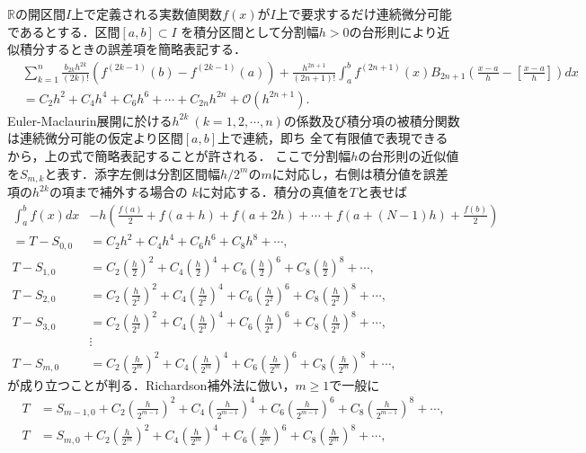 \documentclass[a4j,papersize,disablejfam,slide,14pt]{jsarticle}
\begin{document}
    $\mathbb{R}$の開区間$I$上で定義される実数値関数$f(x)$が$I$上で要求するだけ連続微分可能であるとする．区間$[a,b] \subset I$
    を積分区間として分割幅$h>0$の台形則により近似積分するときの誤差項を簡略表記する．
    \begin{align}
    	&\sum_{k=1}^{n} \frac{b_{2k} h^{2k}}{(2k)!} \left( f^{(2k-1)}(b) - f^{(2k-1)}(a) \right) 
        + \frac{h^{2n+1}}{(2n+1)!} \int_{a}^{b} f^{(2n+1)}(x) B_{2n+1}\left(\frac{x-a}{h} - \left[\frac{x-a}{h}\right]\right)dx \\
        &= C_2 h^2 + C_4 h^4 + C_6 h^6 + \cdots + C_{2n} h^{2n} + \mathcal{O}(h^{2n+1}).
    \end{align}
    {\rm Euler-Maclaurin}展開に於ける$h^{2k}\ (k=1,2,\cdots,n)$の係数及び積分項の被積分関数は連続微分可能の仮定より区間$[a,b]$上で連続，即ち
    全て有限値で表現できるから，上の式で簡略表記することが許される．
    ここで分割幅$h$の台形則の近似値を$S_{m,k}$と表す．添字左側は分割区間幅$h/2^m$の$m$に対応し，右側は積分値を誤差項の$h^{2k}$の項まで補外する場合の
    $k$に対応する．積分の真値を$T$と表せば
    \begin{align}
    	\int_{a}^{b} f(x) dx &- h \left( \frac{f(a)}{2}+f(a+h)+f(a+2h)+\cdots+f(a+(N-1)h)+\frac{f(b)}{2} \right) \\
            = T - S_{0,0}
        &= C_2 h^2 + C_4 h^4 + C_6 h^6 + C_8 h^8 + \cdots, \\
        T - S_{1,0}
        &= C_2 \left( \frac{h}{2} \right)^2 + C_4 \left( \frac{h}{2} \right)^4 + C_6 \left( \frac{h}{2} \right)^6 + C_8 \left( \frac{h}{2} \right)^8 + \cdots, \\
        T - S_{2,0}
        &= C_2 \left( \frac{h}{2^2} \right)^2 + C_4 \left( \frac{h}{2^2} \right)^4 + C_6 \left( \frac{h}{2^2} \right)^6 + C_8 \left( \frac{h}{2^2} \right)^8 + \cdots, \\
        T - S_{3,0}
        &= C_2 \left( \frac{h}{2^3} \right)^2 + C_4 \left( \frac{h}{2^3} \right)^4 + C_6 \left( \frac{h}{2^3} \right)^6 + C_8 \left( \frac{h}{2^3} \right)^8 + \cdots, \\
        &\vdots \\
        T - S_{m,0}
        &= C_2 \left( \frac{h}{2^m} \right)^2 + C_4 \left( \frac{h}{2^m} \right)^4 + C_6 \left( \frac{h}{2^m} \right)^6 + C_8 \left( \frac{h}{2^m} \right)^8 + \cdots,
    \end{align}
    が成り立つことが判る．{\rm Richardson}補外法に倣い，$m \geq 1$で一般に
    \begin{align}
    	T &= S_{m-1,0}
        + C_2 \left( \frac{h}{2^{m-1}} \right)^2 + C_4 \left( \frac{h}{2^{m-1}} \right)^4 + C_6 \left( \frac{h}{2^{m-1}} \right)^6 + C_8 \left( \frac{h}{2^{m-1}} \right)^8 + \cdots, \\
    	T &= S_{m,0}
        + C_2 \left( \frac{h}{2^m} \right)^2 + C_4 \left( \frac{h}{2^m} \right)^4 + C_6 \left( \frac{h}{2^m} \right)^6 + C_8 \left( \frac{h}{2^m} \right)^8 + \cdots,
    \end{align}
\end{document}
